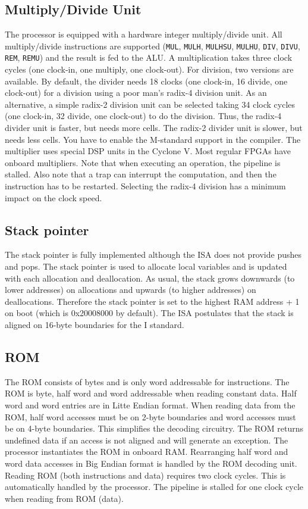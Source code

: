 \documentclass[12pt]{article}
\begin{document}
\subsection{Multiply/Divide Unit}
The processor is equipped with a hardware integer multiply/divide unit. All multiply/divide instructions are supported (\lstinline|MUL|, \lstinline|MULH|, \lstinline|MULHSU|, \lstinline|MULHU|, \lstinline|DIV|, \lstinline|DIVU|, \lstinline|REM|, \lstinline|REMU|) and the result is fed to the ALU. A multiplication takes three clock cycles (one clock-in, one multiply, one clock-out). For division, two versions are available. By default, the divider needs 18 clocks (one clock-in, 16 divide, one clock-out) for a division using a poor man's radix-4 division unit. As an alternative, a simple radix-2 division unit can be selected taking 34 clock cycles (one clock-in, 32 divide, one clock-out) to do the division.  Thus, the radix-4 divider unit is faster, but needs more cells. The radix-2 divider unit is slower, but needs less cells. You have to enable the M-standard support in the compiler. The multiplier uses special DSP units in the Cyclone V. Most regular FPGAs have onboard multipliers. Note that when executing an operation, the pipeline is stalled. Also note that a trap can interrupt the computation, and then the instruction has to be restarted. Selecting the radix-4 division has a minimum impact on the clock speed.


\subsection{Stack pointer}
The stack pointer is fully implemented although the ISA does not provide pushes and pops. The stack pointer is used to allocate local variables and is updated with each allocation and deallocation. As usual, the stack grows downwards (to lower addresses) on allocations and upwards (to higher addresses) on deallocations. Therefore the stack pointer is set to the highest RAM address + 1 on boot (which is 0x20008000 by default). The ISA postulates that the stack is aligned on 16-byte boundaries for the I standard.


\subsection{ROM}
\label{sec:rom}
The ROM consists of bytes and is only word addressable for instructions. The ROM is byte, half word and word addressable when reading constant data. Half word and word entries are in Litte Endian format. When reading data from the ROM, half word accesses must be on 2-byte boundaries and word accesses must be on 4-byte boundaries. This simplifies the decoding circuitry. The ROM returns undefined data if an access is not aligned and will generate an exception. The processor instantiates the ROM in onboard RAM. Rearranging half word and word data accesses in Big Endian format is handled by the ROM decoding unit. Reading ROM (both instructions and data) requires two clock cycles.  This is automatically handled by the processor. The pipeline is stalled for one clock cycle when reading from ROM (data).
\end{document}
